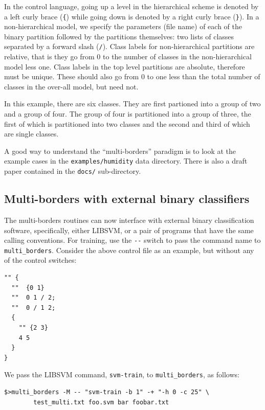 \documentclass[12pt]{article}
\begin{document}
  In the control language, going up a level in the hierarchical scheme is denoted by a left curly brace (\verb'{') while going down is denoted by a right curly brace (\verb$}$).  In a non-hierarchical model, we specify the parameters (file name) of each of the binary partition followed by the partitions themselves: two lists of classes separated by a forward slash (\verb'/').  Class labels for non-hierarchical partitions are relative, that is they go from 0 to the number of classes in the non-hierarchical model less one.  Class labels in the top level partitions are absolute, therefore must be unique.  These should also go from 0 to one less than the total number of classes in the over-all model, but need not.

  In this example, there are six classes.  They are first partioned into a group of two and a group of four.  The group of four is partitioned into a group of three, the first of which is partitioned into two classes and the second and third of which are single classes.  

A good way to understand the ``multi-borders'' paradigm is to look at the example cases in the \verb"examples/humidity" data directory.  There is also a draft paper contained in the \verb"docs/" sub-directory.


\subsection{Multi-borders with external binary classifiers}

The multi-borders routines can now interface with external binary classification software, specifically, either LIBSVM, or a pair of programs that have the same calling conventions.  For training, use the \verb"--" switch to pass the command name to \verb/multi_borders/.  Consider the above control file as an example, but without any of the control switches:

\begin{verbatim}
"" {
  ""  {0 1}
  ""  0 1 / 2;
  ""  0 / 1 2;
  {
    "" {2 3}
    4 5
  } 
} 
\end{verbatim}

We pass the LIBSVM command, \verb"svm-train", to \verb"multi_borders", as follows:

\begin{verbatim}
$>multi_borders -M -- "svm-train -b 1" -+ "-h 0 -c 25" \
		test_multi.txt foo.svm bar foobar.txt
\end{verbatim}
\end{document}
